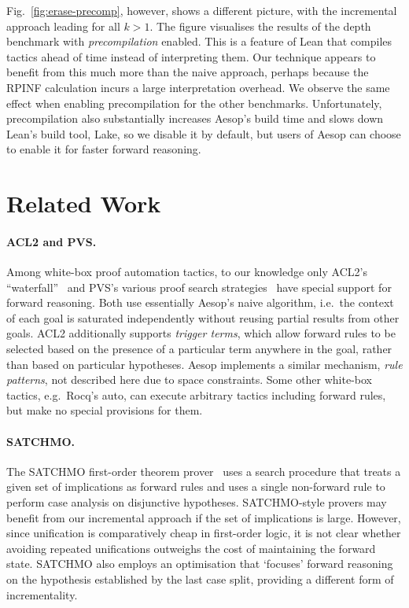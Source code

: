 \documentclass[runningheads]{llncs}
\begin{document}
Fig.~\ref{fig:erase-precomp}, however, shows a different picture, with the incremental approach leading for all $k > 1$.
The figure visualises the results of the depth benchmark with \emph{precompilation} enabled.
This is a feature of Lean that compiles tactics ahead of time instead of interpreting them.
Our technique appears to benefit from this much more than the naive approach, perhaps because the RPINF calculation incurs a large interpretation overhead.
We observe the same effect when enabling precompilation for the other benchmarks.
Unfortunately, precompilation also substantially increases Aesop's build time and slows down Lean's build tool, Lake, so we disable it by default, but users of Aesop can choose to enable it for faster forward reasoning.

\section{Related Work}

\paragraph{ACL2 and PVS.}
Among white-box proof automation tactics, to our knowledge only ACL2's \enquote{waterfall}~\cite{ACL2} and PVS's various proof search strategies~\cite{ACL2,PVS} have special support for forward reasoning.
Both use essentially Aesop's naive algorithm, i.e.\ the context of each goal is saturated independently without reusing partial results from other goals.
ACL2 additionally supports \emph{trigger terms}, which allow forward rules to be selected based on the presence of a particular term anywhere in the goal, rather than based on particular hypotheses.
Aesop implements a similar mechanism, \emph{rule patterns}, not described here due to space constraints.
Some other white-box tactics, e.g.\ Rocq's auto, can execute arbitrary tactics including forward rules, but make no special provisions for them.

\paragraph{SATCHMO.}
The SATCHMO first-order theorem prover~\cite{SATCHMO} uses a search procedure that treats a given set of implications as forward rules and uses a single non-forward rule to perform case analysis on disjunctive hypotheses.
SATCHMO-style provers may benefit from our incremental approach if the set of implications is large.
However, since unification is comparatively cheap in first-order logic, it is not clear whether avoiding repeated unifications outweighs the cost of maintaining the forward state.
SATCHMO also employs an optimisation that \enquote*{focuses} forward reasoning on the hypothesis established by the last case split, providing a different form of incrementality.
\end{document}
